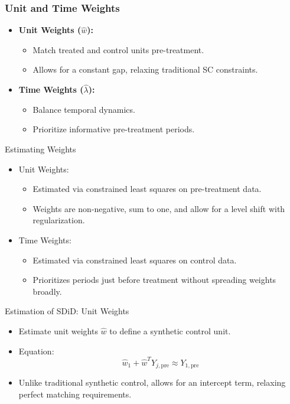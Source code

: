 \documentclass{beamer}
\begin{document}
\begin{frame}
\frametitle{Unit and Time Weights}

\begin{itemize}
    \item \textbf{Unit Weights (\(\hat{w}\)):}
        \begin{itemize}
            \item Match treated and control units pre-treatment.
            \item Allows for a constant gap, relaxing traditional SC constraints.
        \end{itemize}
    \item \textbf{Time Weights (\(\hat{\lambda}\)):}
        \begin{itemize}
            \item Balance temporal dynamics.
            \item Prioritize informative pre-treatment periods.
        \end{itemize}
\end{itemize}

\end{frame}


\begin{frame}{Estimating Weights}

\begin{itemize}
    \item Unit Weights:
    \begin{itemize}
        \item Estimated via constrained least squares on pre-treatment data.
        \item Weights are non-negative, sum to one, and allow for a level shift with regularization.
    \end{itemize}
    \item Time Weights:
    \begin{itemize}
        \item Estimated via constrained least squares on control data.
        \item Prioritizes periods just before treatment without spreading weights broadly.
    \end{itemize}
\end{itemize}

\end{frame}



\begin{frame}{Estimation of SDiD: Unit Weights}

\begin{itemize}
    \item Estimate unit weights \(\widehat{w}\) to define a synthetic control unit.
    \item Equation: 
    \[
    \widehat{w}_1 + \widehat{w}^T Y_{j,\text{pre}} \approx Y_{1,\text{pre}}
    \]
    \item Unlike traditional synthetic control, allows for an intercept term, relaxing perfect matching requirements.
\end{itemize}

\end{frame}
\end{document}
